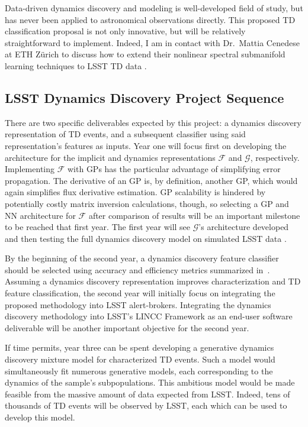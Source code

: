 \documentclass[modern]{aastex631}
\begin{document}
Data-driven dynamics discovery and modeling is well-developed field of study, but has never been applied to astronomical observations directly. 
This proposed TD classification proposal is not only innovative, but will be relatively straightforward to implement. 
Indeed, I am in contact with Dr.\ Mattia Cenedese at ETH Zürich to discuss how to extend their nonlinear spectral submanifold learning techniques to LSST TD data \citep{Cenedese2022}. 

\subsection{LSST Dynamics Discovery Project Sequence}
There are two specific deliverables expected by this project: a dynamics discovery representation of TD events, and a subsequent classifier using said representation's features as inputs. 
Year one will focus first on developing the architecture for the implicit and dynamics representations $\mathcal{F}$ and $\mathcal{G}$, respectively. 
Implementing $\mathcal{F}$ with GPs has the particular advantage of simplifying error propagation. 
The derivative of an GP is, by definition, another GP, which would again simplifies flux derivative estimation. 
GP scalability is hindered by potentially costly matrix inversion calculations, though, so selecting a GP and NN architecture for $\mathcal{F}$ after comparison of results will be an important milestone to be reached that first year. 
The first year will see $\mathcal{G}$'s architecture developed and then testing the full dynamics discovery model on simulated LSST data \citep{Malz2019}.

By the beginning of the second year, a dynamics discovery feature classifier should be selected using accuracy and efficiency metrics summarized in~\cite{Malz2019}.  
Assuming a dynamics discovery representation improves characterization and TD feature classification, the second year will initially focus on integrating the proposed methodology into LSST alert-brokers. 
Integrating the dynamics discovery methodology into LSST's LINCC Framework as an end-user software deliverable will be another important objective for the second year.

If time permits, year three can be spent developing a generative dynamics discovery mixture model for characterized TD events. 
Such a model would simultaneously fit numerous generative models, each corresponding to the dynamics of the sample's subpopulations. 
This ambitious model would be made feasible from the massive amount of data expected from LSST. 
Indeed, tens of thousands of TD events will be observed by LSST, each which can be used to develop this model. 
\end{document}
